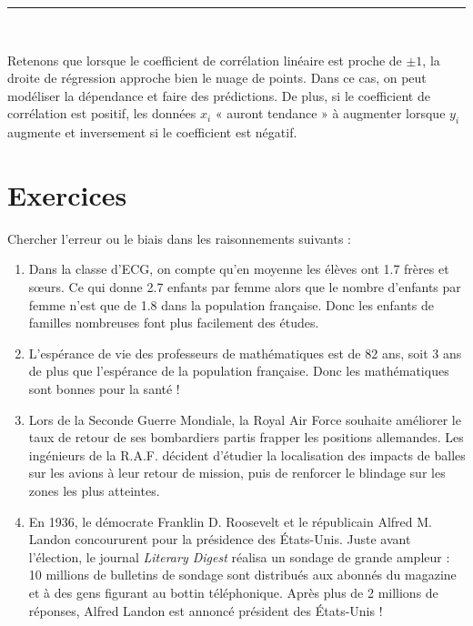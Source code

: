 \documentclass[../PolyS4.tex]{subfiles}
\begin{document}
\vspace{1em}
\hrule
\vspace{1em}

\begin{Rmq}$\,$

Retenons que lorsque le coefficient de corrélation linéaire est proche de $\pm 1$, la droite de régression approche bien le nuage de points. Dans ce cas, on peut modéliser la dépendance et faire des prédictions. De plus, si le coefficient de corrélation est positif, les données $x_i$ « auront tendance » à augmenter lorsque $y_i$ augmente et inversement si le coefficient est négatif.
\end{Rmq}

\newpage
\section{Exercices}



Chercher l'erreur ou le biais dans les raisonnements suivants :

\begin{enumerate}
    \item Dans la classe d'ECG, on compte qu'en moyenne les élèves ont 1.7 frères et sœurs. Ce qui donne 2.7 enfants par femme alors que le nombre d'enfants par femme n'est que de 1.8 dans la population française. Donc les enfants de familles nombreuses font plus facilement des études.
    
    \item L'espérance de vie des professeurs de mathématiques est de 82 ans, soit 3 ans de plus que l'espérance de la population française. Donc les mathématiques sont bonnes pour la santé !
    
    \item Lors de la Seconde Guerre Mondiale, la Royal Air Force souhaite améliorer le taux de retour de ses bombardiers partis frapper les positions allemandes. Les ingénieurs de la R.A.F. décident d'étudier la localisation des impacts de balles sur les avions à leur retour de mission, puis de renforcer le blindage sur les zones les plus atteintes.
    
    \item En 1936, le démocrate Franklin D. Roosevelt et le républicain Alfred M. Landon concoururent pour la présidence des États-Unis. Juste avant l'élection, le journal \textit{Literary Digest} réalisa un sondage de grande ampleur : 10 millions de bulletins de sondage sont distribués aux abonnés du magazine et à des gens figurant au bottin téléphonique. Après plus de 2 millions de réponses, Alfred Landon est annoncé président des États-Unis !
\end{enumerate}
\end{document}
